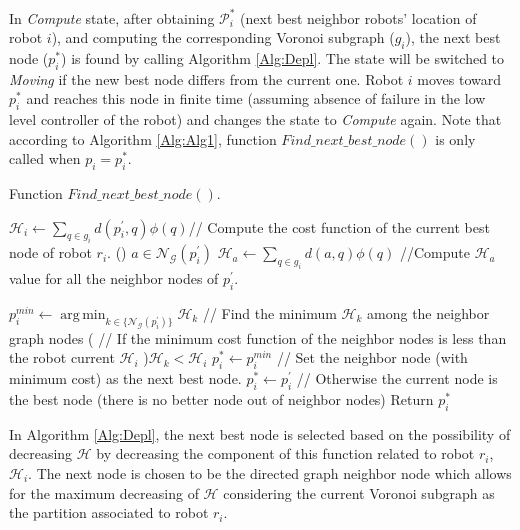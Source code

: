 \documentclass[smallcondensed]{svjour3}
\DeclareMathOperator*{\argmin}{arg\,min}
\begin{document}
In \textit{Compute} state, after obtaining $\mathcal{P}_i^*$ (next best neighbor robots' location of robot $i$), and computing the corresponding Voronoi subgraph ($g_i$), the next best node ($p_i^*$) is found by calling Algorithm \ref{Alg:Depl}. The state will be switched to \textit{Moving} if the new best node differs from the current one. Robot $i$ moves toward $p_i^*$ and reaches this node in finite time (assuming absence of failure in the low level controller of the robot) and changes the state to \textit{Compute} again. 
%
Note that according to Algorithm \ref{Alg:Alg1}, function $Find\_next\_best\_node()$ is only called when $p_i=p_i^*$.\\   
%
\begin{algorithm}[h]
\caption{Function $Find\_next\_best\_node()$. }
\label{Alg:Depl}
\SetAlgoVlined
\DontPrintSemicolon
{}
%
   \nl $\mathcal{H}_i \gets \sum_{q \in g_i} d(p_i^\prime,q)\phi(q)${\color{blue}// Compute the cost function of the current best node of robot $r_i$. }\;
   \nl \ForEach() {$a \in \mathcal{N}_{\mathcal G}(p_i^\prime)$}	
		{	
			$\mathcal{H}_a \gets \sum_{q \in g_i} d(a,q)\phi(q)$ 	{ \color{blue}//Compute $\mathcal{H}_a$ value for all the neighbor nodes of $p_i^\prime$.}\;
		}
			
   \nl $p_i^{min} \gets  \argmin_{k \in \{\mathcal{N}_{\mathcal G}(p_i^\prime) \} } \mathcal{H}_k$ { \color{blue}// Find the minimum $\mathcal{H}_k$ among the neighbor graph nodes} \; %
	\nl \If ({\color{blue} // If the minimum cost function of the neighbor nodes is less than the robot current $\mathcal{H}_i$ }\color{black}){$\mathcal{H}_k <  \mathcal{H}_i$}
	{
		\nl $p_i^* \gets p_i^{min}$ {\color{blue}// Set the neighbor node (with minimum cost) as the next best node.}\;
	}
	\Else
	{
		\nl $p_i^* \gets p_i^\prime$ {\color{blue}// Otherwise the current node is the best node (there is no better node out of neighbor nodes)}\;
	}
   \nl Return $p_i^*$ \;
\end {algorithm}
%

In Algorithm \ref{Alg:Depl}, the next best node is selected based on the possibility of decreasing $\mathcal{H}$ by decreasing the component of this function related to robot $r_i$, $\mathcal{H}_i$. The next node is chosen to be the directed graph neighbor node which allows for the maximum decreasing of $\mathcal H$ considering the current Voronoi subgraph as the partition associated to robot $r_i$.
\end{document}
